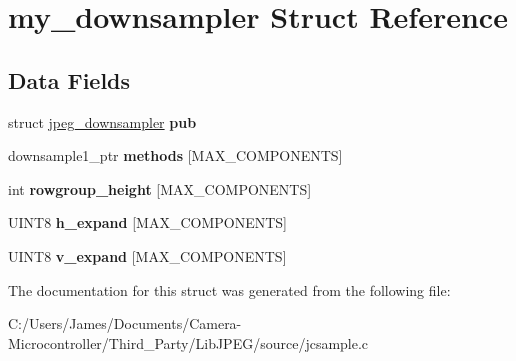 \hypertarget{structmy__downsampler}{}\section{my\+\_\+downsampler Struct Reference}
\label{structmy__downsampler}
\subsection*{Data Fields}
\begin{DoxyCompactItemize}
\item 
\mbox{\label{structmy__downsampler_aacdf78bf723ab3ce407474b387c1ad3b}} 
struct \hyperlink{structjpeg__downsampler}{jpeg\+\_\+downsampler} {\bfseries pub}
\item 
\mbox{\label{structmy__downsampler_a2e7a0656760062f39b86f1460a9b09d6}} 
downsample1\+\_\+ptr {\bfseries methods} \mbox{[}M\+A\+X\+\_\+\+C\+O\+M\+P\+O\+N\+E\+N\+TS\mbox{]}
\item 
\mbox{\label{structmy__downsampler_a7507e89d319f0c5754990bbd089158a6}} 
int {\bfseries rowgroup\+\_\+height} \mbox{[}M\+A\+X\+\_\+\+C\+O\+M\+P\+O\+N\+E\+N\+TS\mbox{]}
\item 
\mbox{\label{structmy__downsampler_a02f93051387de0a3e536dfc8d58f33a3}} 
U\+I\+N\+T8 {\bfseries h\+\_\+expand} \mbox{[}M\+A\+X\+\_\+\+C\+O\+M\+P\+O\+N\+E\+N\+TS\mbox{]}
\item 
\mbox{\label{structmy__downsampler_ad25fd6460bdc4796d0d3f6832187f51f}} 
U\+I\+N\+T8 {\bfseries v\+\_\+expand} \mbox{[}M\+A\+X\+\_\+\+C\+O\+M\+P\+O\+N\+E\+N\+TS\mbox{]}
\end{DoxyCompactItemize}


The documentation for this struct was generated from the following file\+:\begin{DoxyCompactItemize}
\item 
C\+:/\+Users/\+James/\+Documents/\+Camera-\/\+Microcontroller/\+Third\+\_\+\+Party/\+Lib\+J\+P\+E\+G/source/jcsample.\+c\end{DoxyCompactItemize}
